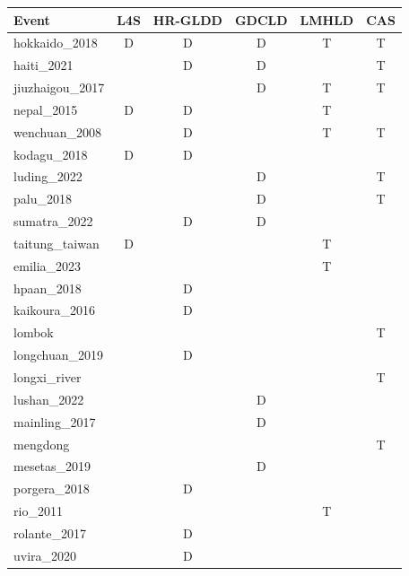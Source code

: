 \begin{tabular}{lccccc}
\toprule
Event & L4S & HR-GLDD & GDCLD & LMHLD & CAS \\
\midrule
hokkaido\_2018 & D & D & D & T & T \\
haiti\_2021 &  & D & D &  & T \\
jiuzhaigou\_2017 &  &  & D & T & T \\
nepal\_2015 & D & D &  & T &  \\
wenchuan\_2008 &  & D &  & T & T \\
kodagu\_2018 & D & D &  &  &  \\
luding\_2022 &  &  & D &  & T \\
palu\_2018 &  &  & D &  & T \\
sumatra\_2022 &  & D & D &  &  \\
taitung\_taiwan & D &  &  & T &  \\
emilia\_2023 &  &  &  & T &  \\
hpaan\_2018 &  & D &  &  &  \\
kaikoura\_2016 &  & D &  &  &  \\
lombok &  &  &  &  & T \\
longchuan\_2019 &  & D &  &  &  \\
longxi\_river &  &  &  &  & T \\
lushan\_2022 &  &  & D &  &  \\
mainling\_2017 &  &  & D &  &  \\
mengdong &  &  &  &  & T \\
mesetas\_2019 &  &  & D &  &  \\
porgera\_2018 &  & D &  &  &  \\
rio\_2011 &  &  &  & T &  \\
rolante\_2017 &  & D &  &  &  \\
uvira\_2020 &  & D &  &  &  \\
\bottomrule
\end{tabular}
